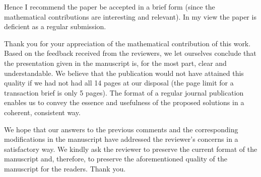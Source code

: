 \begin{reviewer}
Hence I recommend the paper be accepted in a brief form (since the mathematical
contributions are interesting and relevant). In my view the paper is deficient
as a regular submission.
\end{reviewer}

\begin{authors}
Thank you for your appreciation of the mathematical contribution of this work.
Based on the feedback received from the reviewers, we let ourselves conclude
that the presentation given in the manuscript is, for the most part, clear and
understandable. We believe that the publication would not have attained this
quality if we had not had all 14 pages at our disposal (the page limit for a
transaction brief is only 5 pages). The format of a regular journal publication
enables us to convey the essence and usefulness of the proposed solutions in a
coherent, consistent way.

We hope that our answers to the previous comments and the corresponding
modifications in the manuscript have addressed the reviewer's concerns in a
satisfactory way. We kindly ask the reviewer to preserve the current format of
the manuscript and, therefore, to preserve the aforementioned quality of the
manuscript for the readers. Thank you.
\end{authors}
